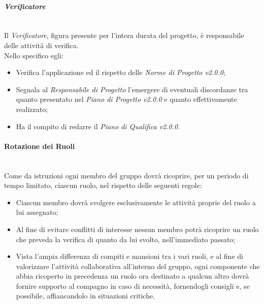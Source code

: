 \paragraph{\textit{Verificatore}} ~\\
	Il \textit{Verificatore}, figura presente per l'intera durata del progetto, è responsabile delle attività di 				verifica.\\
	Nello specifico egli:
	\begin{itemize}
	\item Verifica l'applicazione ed il rispetto delle \textit{Norme di Progetto v2.0.0};
	\item Segnala al \textit{Responsabile di Progetto} l'emergere di eventuali discordanze tra quanto presentato nel 			\textit{Piano di Progetto v2.0.0} e quanto effettivamente realizzato;
	\item Ha il compito di redarre il \textit{Piano di Qualifica v2.0.0}.
	\end{itemize}

\paragraph{Rotazione dei Ruoli} ~\\
	Come da istruzioni ogni membro del gruppo dovrà ricoprire, per un periodo di tempo limitato, ciascun ruolo, nel 			rispetto delle seguenti regole:
	\begin{itemize}
	\item Ciascun membro dovrà svolgere esclusivamente le attività proprie del ruolo a lui assegnato;
	\item Al fine di evitare conflitti di interesse nessun membro potrà ricoprire un ruolo che preveda la 									verifica di quanto da lui svolto, nell'immediato passato;
	\item Vista l'ampia differenza di compiti e mansioni tra i vari ruoli, e al fine di valorizzare l'attività 						collaborativa all'interno del gruppo, ogni componente che abbia ricoperto in precedenza un ruolo ora destinato 			a qualcun altro dovrà fornire supporto al compagno in caso di necessità, fornendogli consigli e, se possibile, 			affiancandolo in situazioni critiche.
	\end{itemize}
